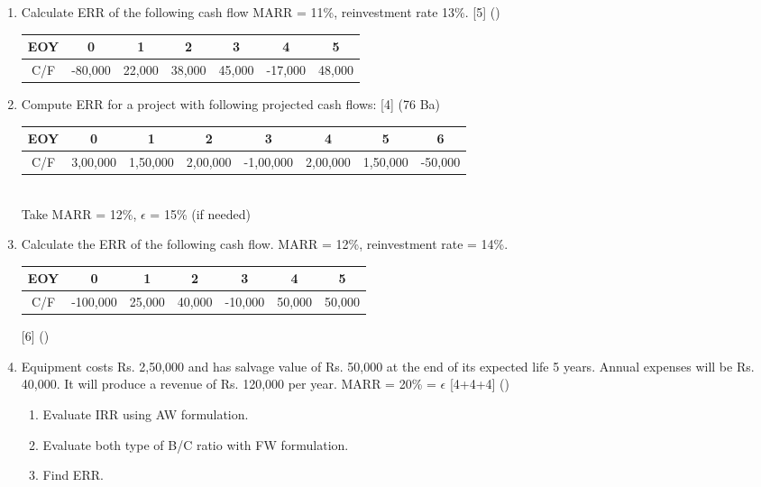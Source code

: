 \documentclass[12pt]{article}
\begin{document}
\begin{enumerate}[topsep = 0pt]
				\item Calculate ERR of the following cash flow MARR = 11\%, reinvestment rate 13\%. \hfill [5] ()
				\begin{tabular}{|c|c|c|c|c|c|c|}
					\hline
					EOY & 0 & 1 & 2 & 3 & 4 & 5 \\ \hline
					C/F & -80,000 & 22,000 & 38,000 & 45,000 & -17,000 & 48,000 \\ 
					\hline
				\end{tabular}
				
				\item Compute ERR for a project with following projected cash flows: \hfill [4] (76 Ba)
				\begin{tabular}{|c|c|c|c|c|c|c|c|}
					\hline
					EOY & 0 & 1 & 2 & 3 & 4 & 5 & 6\\ \hline
					C/F & 3,00,000 & 1,50,000 & 2,00,000 & -1,00,000 & 2,00,000 & 1,50,000 & -50,000\\ 
					\hline
				\end{tabular}\\
				Take MARR = 12\%, $\epsilon$ = 15\% (if needed)
				
				\item Calculate the ERR of the following cash flow. MARR = 12\%, reinvestment rate = 14\%.\\
				\begin{tabular}{|c|c|c|c|c|c|c|}
					\hline
					EOY & 0 & 1 & 2 & 3 & 4 & 5\\ \hline
					C/F & -100,000 & 25,000 & 40,000 & -10,000 & 50,000 & 50,000 \\ \hline
				\end{tabular} \hfill [6] ()
				
				\item Equipment costs Rs. 2,50,000 and has salvage value of Rs. 50,000 at the end of its expected life 5 years. Annual expenses will be Rs. 40,000. It will produce a revenue of Rs. 120,000 per year. MARR = 20\% = $\epsilon$ \hfill [4+4+4] ()
				\begin{enumerate}[noitemsep, topsep = 0pt, label = \alph*.]
					\item Evaluate IRR using AW formulation.
					\item Evaluate both type of B/C ratio with FW formulation.
					\item Find ERR.
				\end{enumerate}
			\end{enumerate}
\end{document}
